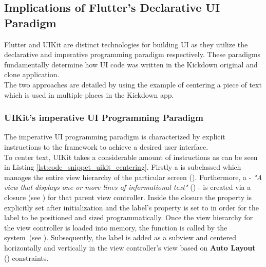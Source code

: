 \subsection{Implications of Flutter's Declarative UI Paradigm} \label{section::declarative_vs_imperative_ui}
Flutter and UIKit are distinct technologies for building UI as they utilize the declarative and imperative programming paradigm respectively. 
These paradigms fundamentally determine how UI code was written in the Kickdown original and clone application.\\
The two approaches are detailed by using the example of centering a piece of text which is used in multiple places in the Kickdown app.

\subsubsection{UIKit's imperative UI Programming Paradigm}
The imperative UI programming paradigm is characterized by explicit instructions to the framework to achieve a desired user interface.\\
To center text, UIKit takes a considerable amount of instructions as can be seen in Listing \ref{lst:code_snippet_uikit_centering}.
Firstly a  is subclassed which manages the entire view hierarchy of the particular screen (\cite{UIViewControllerDocumentation2021}). 
Furthermore, a  - \textit{"A view that displays one or more lines of informational text"} (\cite[l.1]{UILabelDocumentation2021}) - is created via a closure (see \cite{ClosureDocumentation2021}) for that parent view controller.
Inside the closure the  property is explicitly set after initialization and the label's  property is set to  in order for the label to be positioned and sized programmatically.
Once the view hierarchy for the view controller is loaded into memory, the  function is called by the system (see \cite{viewDidLoadDocumentation2021}).
Subsequently, the label is added as a subview and centered horizontally and vertically in the view controller's view based on \textbf{Auto Layout} (\cite{AutoLayoutDocumentation2016}) constraints.\\

